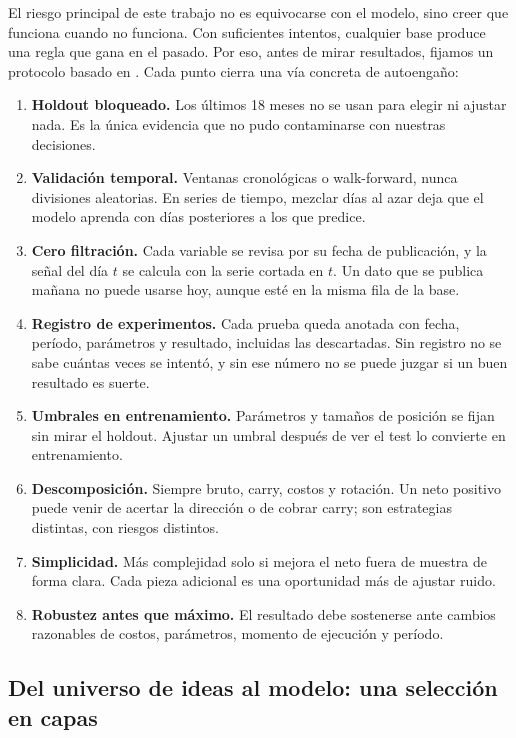 \documentclass[10pt,a4paper]{article}
\begin{document}
El riesgo principal de este trabajo no es equivocarse con el modelo, sino creer que
funciona cuando no funciona. Con suficientes intentos, cualquier base produce una regla
que gana en el pasado. Por eso, antes de mirar resultados, fijamos un protocolo basado
en \citet{lopezdeprado2018}. Cada punto cierra una vía concreta de autoengaño:
\begin{enumerate}
  \item \textbf{Holdout bloqueado.} Los últimos 18 meses no se usan para elegir ni
        ajustar nada. Es la única evidencia que no pudo contaminarse con nuestras
        decisiones.
  \item \textbf{Validación temporal.} Ventanas cronológicas o walk-forward, nunca
        divisiones aleatorias. En series de tiempo, mezclar días al azar deja que el
        modelo aprenda con días posteriores a los que predice.
  \item \textbf{Cero filtración.} Cada variable se revisa por su fecha de publicación,
        y la señal del día $t$ se calcula con la serie cortada en $t$. Un dato que se
        publica mañana no puede usarse hoy, aunque esté en la misma fila de la base.
  \item \textbf{Registro de experimentos.} Cada prueba queda anotada con fecha,
        período, parámetros y resultado, incluidas las descartadas. Sin registro no se
        sabe cuántas veces se intentó, y sin ese número no se puede juzgar si un buen
        resultado es suerte.
  \item \textbf{Umbrales en entrenamiento.} Parámetros y tamaños de posición se fijan
        sin mirar el holdout. Ajustar un umbral después de ver el test lo convierte en
        entrenamiento.
  \item \textbf{Descomposición.} Siempre bruto, carry, costos y rotación. Un neto
        positivo puede venir de acertar la dirección o de cobrar carry; son estrategias
        distintas, con riesgos distintos.
  \item \textbf{Simplicidad.} Más complejidad solo si mejora el neto fuera de muestra
        de forma clara. Cada pieza adicional es una oportunidad más de ajustar ruido.
  \item \textbf{Robustez antes que máximo.} El resultado debe sostenerse ante cambios
        razonables de costos, parámetros, momento de ejecución y período.
\end{enumerate}

\subsection{Del universo de ideas al modelo: una selección en capas}\label{sec:embudo}
\end{document}
